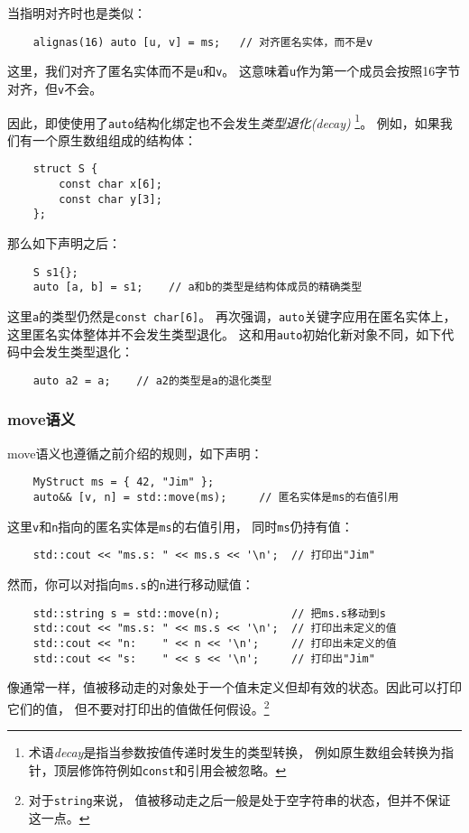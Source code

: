 当指明对齐时也是类似：
\begin{lstlisting}
    alignas(16) auto [u, v] = ms;   // 对齐匿名实体，而不是v
\end{lstlisting}
这里，我们对齐了匿名实体而不是\texttt{u}和\texttt{v}。
这意味着\texttt{u}作为第一个成员会按照16字节对齐，但\texttt{v}不会。

因此，即使使用了\texttt{auto}结构化绑定也不会发生\emph{类型退化(decay)}
\footnote{术语\emph{decay}是指当参数按值传递时发生的类型转换，
例如原生数组会转换为指针，顶层修饰符例如\texttt{const}和引用会被忽略。}。
例如，如果我们有一个原生数组组成的结构体：
\begin{lstlisting}
    struct S {
        const char x[6];
        const char y[3];
    };
\end{lstlisting}
那么如下声明之后：
\begin{lstlisting}
    S s1{};
    auto [a, b] = s1;    // a和b的类型是结构体成员的精确类型
\end{lstlisting}
这里\texttt{a}的类型仍然是\texttt{const char[6]}。
再次强调，\texttt{auto}关键字应用在匿名实体上，这里匿名实体整体并不会发生类型退化。
这和用\texttt{auto}初始化新对象不同，如下代码中会发生类型退化：
\begin{lstlisting}
    auto a2 = a;    // a2的类型是a的退化类型
\end{lstlisting}

\subsubsection{move语义}
move语义也遵循之前介绍的规则，如下声明：
\begin{lstlisting}
    MyStruct ms = { 42, "Jim" };
    auto&& [v, n] = std::move(ms);     // 匿名实体是ms的右值引用
\end{lstlisting}
这里\texttt{v}和\texttt{n}指向的匿名实体是\texttt{ms}的右值引用，
同时\texttt{ms}仍持有值：
\begin{lstlisting}
    std::cout << "ms.s: " << ms.s << '\n';  // 打印出"Jim"
\end{lstlisting}
然而，你可以对指向\texttt{ms.s}的\texttt{n}进行移动赋值：
\begin{lstlisting}
    std::string s = std::move(n);           // 把ms.s移动到s
    std::cout << "ms.s: " << ms.s << '\n';  // 打印出未定义的值
    std::cout << "n:    " << n << '\n';     // 打印出未定义的值
    std::cout << "s:    " << s << '\n';     // 打印出"Jim"
\end{lstlisting}
像通常一样，值被移动走的对象处于一个值未定义但却有效的状态。因此可以打印它们的值，
但不要对打印出的值做任何假设。\footnote{对于\texttt{string}来说，
值被移动走之后一般是处于空字符串的状态，但并不保证这一点。}

